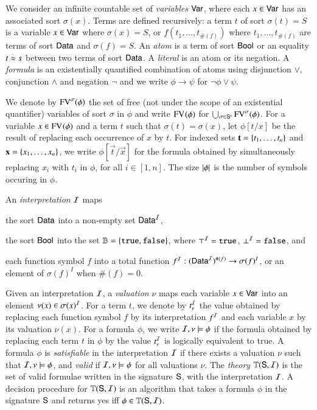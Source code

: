 \documentclass[10pt,conference,letterpaper,twocolumn]{IEEEtran}
\begin{document}
We consider an infinite countable set of \emph{variables} $\mathsf{Var}$,
where each $x \in \mathsf{Var}$ has an associated sort $\sigma(x)$. Terms are
defined recursively: a term $t$ of sort $\sigma(t)=S$ is a variable $x
\in \mathsf{Var}$ where $\sigma(x)=S$, or $f(t_1,\ldots,t_{\#(f)})$ where
$t_1,\ldots,t_{\#(f)}$ are terms of sort $\mathsf{Data}$ and $\sigma(f)=S$. An
\emph{atom} is a term of sort $\mathsf{Bool}$ or an equality $t \approx s$
between two terms of sort $\mathsf{Data}$. A \emph{literal} is an atom or its
negation. A \emph{formula} is an existentially quantified combination
of atoms using disjunction $\vee$, conjunction $\wedge$ and negation
$\neg$ and we write $\phi \rightarrow \psi$ for $\neg\phi \vee \psi$.

We denote by $\mathrm{FV}^{\sigma}(\phi)$ the set of free (not under the scope
of an existential quantifier) variables of sort $\sigma$ in $\phi$ and
write $\mathrm{FV}^{}(\phi)$ for $\bigcup_{\sigma \in \mathsf{S}^\mathrm{s}}
\mathrm{FV}^{\sigma}(\phi)$. For a variable $x \in \mathrm{FV}^{}(\phi)$ and a term $t$
such that $\sigma(t) = \sigma(x)$, let $\phi[t/x]$ be the result of
replacing each occurrence of $x$ by $t$. For indexed sets
$\mathbf t=\left\{ t_1,\ldots,t_n \right\}$ and $\mathbf x=\left\{ x_1,\ldots,x_n \right\}$, we
write $\phi[\vec{t}/\vec{x}]$ for the formula obtained by
simultaneously replacing $x_i$ with $t_i$ in $\phi$, for all
$i\in[1,n]$. The size ${|{\phi}|}$ is the number of symbols occuring
in $\phi$.

An \emph{interpretation} $\mathcal{I}$ maps\begin{inparaenum}[(1)]
\item the sort $\mathsf{Data}$ into a non-empty set $\mathsf{Data}^{\mathcal{I}}$, 
%
\item the sort $\mathsf{Bool}$ into the set $\mathbb{B} = \left\{ \mathtt{true},\mathtt{false} \right\}$, where
  $\top^{\mathcal{I}} = \mathtt{true}$, $\bot^{\mathcal{I}} = \mathtt{false}$, and
%
\item each function symbol $f$ into a total function $f^{\mathcal{I}} :
  (\mathsf{Data}^{\mathcal{I}})^{\#(f)} \rightarrow \sigma(f)^I$, or an element of
  $\sigma(f)^I$ when $\#(f)=0$.
\end{inparaenum}
Given an interpretation $\mathcal{I}$, a \emph{valuation} $\nu$ maps each
variable $x \in \mathsf{Var}$ into an element $\nu(x) \in \sigma(x)^{\mathcal{I}}$. For
a term $t$, we denote by $t^{\mathcal{I}}_\nu$ the value obtained by replacing
each function symbol $f$ by its interpretation $f^{\mathcal{I}}$ and each
variable $x$ by its valuation $\nu(x)$. For a formula $\phi$, we write
$\mathcal{I},\nu \models \phi$ if the formula obtained by replacing each term
$t$ in $\phi$ by the value $t^{\mathcal{I}}_\nu$ is logically equivalent to true.
A formula $\phi$ is \emph{satisfiable} in the interpretation $\mathcal{I}$ if
there exists a valuation $\nu$ such that $\mathcal{I},\nu \models \phi$, and
\emph{valid} if $\mathcal{I},\nu \models \phi$ for all valuations $\nu$.  The
\emph{theory} $\mathbb{T}(\mathsf{S},\mathcal{I})$ is the set of valid formulae written
in the signature $\mathsf{S}$, with the interpretation $\mathcal{I}$. A decision
procedure for $\mathbb{T}(\mathsf{S},\mathcal{I})$ is an algorithm that takes a formula
$\phi$ in the signature $\mathsf{S}$ and returns yes iff $\phi \in
\mathbb{T}(\mathsf{S},\mathcal{I})$. 
\end{document}

